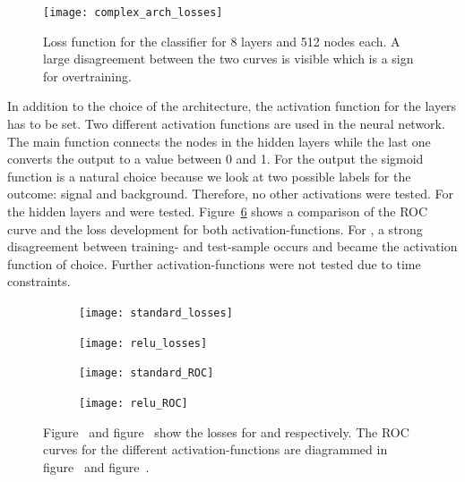 \begin{figure}[htbp]
	\centering
	\texttt{[image: complex\_arch\_losses]}
	\caption[Classifier losses for a complex architecture]{Loss function for the classifier for \num{8} layers and \num{512} nodes each. A large disagreement between the two curves is visible which is a sign for overtraining.}
	\label{fig:complex_arch}
\end{figure}

In addition to the choice of the architecture, the activation function for the layers has to be set.
Two different activation functions are used in the neural network. The main function connects the nodes in the hidden layers while the last one converts the output to a value between \num{0} and \num{1}. For the output the sigmoid function is a natural choice because we look at two possible labels for the outcome: signal and background. Therefore, no other activations were tested.
For the hidden layers \ELU and \RELU were tested. Figure~\ref{fig:activ} shows a comparison of the ROC curve and the loss development for both activation-functions. For \RELU, a strong disagreement between training- and test-sample occurs and \ELU became the activation function of choice. Further activation-functions were not tested due to time constraints.

\begin{figure}[htbp]
    \centering
    \begin{subfigure}[b]{0.48\textwidth}
        \texttt{[image: standard\_losses]}
        \caption{}
        \label{fig:activ:standard:loss}
    \end{subfigure}
\quad
    \begin{subfigure}[b]{0.48\textwidth}
        \texttt{[image: relu\_losses]}
        \caption{}
        \label{fig:activ:relu:loss}
    \end{subfigure}

    \begin{subfigure}[b]{0.48\textwidth}
		\texttt{[image: standard\_ROC]}
		\caption{}
		\label{fig:activ:standard:roc}
	\end{subfigure}
\quad
	\begin{subfigure}[b]{0.48\textwidth}
		\texttt{[image: relu\_ROC]}
		\caption{}
		\label{fig:activ:relu:roc}
	\end{subfigure}
    \caption[Classifier performance for different activation functions]{Figure~ and figure~ show the losses for \ELU and \RELU respectively. The ROC curves for the different activation-functions are diagrammed in figure~ and figure~.}
	\label{fig:activ}
\end{figure}


